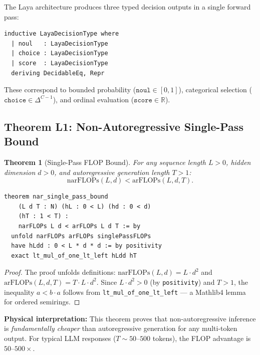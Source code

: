 \documentclass[10pt,journal,compsoc]{IEEEtran}
\newtheorem{theorem}{Theorem}
\theoremstyle{remark}
\begin{document}
The Laya architecture produces three typed decision outputs in a single forward pass:

\begin{lstlisting}[caption={Laya Decision Types in Lean 4}]
inductive LayaDecisionType where
  | noul   : LayaDecisionType
  | choice : LayaDecisionType
  | score  : LayaDecisionType
  deriving DecidableEq, Repr
\end{lstlisting}

These correspond to bounded probability ($\texttt{noul} \in [0,1]$), categorical selection ($\texttt{choice} \in \Delta^{C-1}$), and ordinal evaluation ($\texttt{score} \in \mathbb{R}$).

\subsection{Theorem L1: Non-Autoregressive Single-Pass Bound}

\begin{theorem}[Single-Pass FLOP Bound]
For any sequence length $L > 0$, hidden dimension $d > 0$, and autoregressive generation length $T > 1$:
\begin{equation}
\text{narFLOPs}(L, d) < \text{arFLOPs}(L, d, T).
\end{equation}
\end{theorem}

\begin{lstlisting}[caption={Theorem L1 in Lean 4 --- Fully Proved}]
theorem nar_single_pass_bound
    (L d T : N) (hL : 0 < L) (hd : 0 < d)
    (hT : 1 < T) :
    narFLOPs L d < arFLOPs L d T := by
  unfold narFLOPs arFLOPs singlePassFLOPs
  have hLdd : 0 < L * d * d := by positivity
  exact lt_mul_of_one_lt_left hLdd hT
\end{lstlisting}

\begin{proof}
The proof unfolds definitions: $\text{narFLOPs}(L, d) = L \cdot d^2$ and $\text{arFLOPs}(L, d, T) = T \cdot L \cdot d^2$. Since $L \cdot d^2 > 0$ (by \texttt{positivity}) and $T > 1$, the inequality $a < b \cdot a$ follows from \texttt{lt\_mul\_of\_one\_lt\_left} --- a Mathlib4 lemma for ordered semirings.
\end{proof}

\textbf{Physical interpretation:} This theorem proves that non-autoregressive inference is \emph{fundamentally cheaper} than autoregressive generation for any multi-token output. For typical LLM responses ($T \sim 50$--$500$ tokens), the FLOP advantage is $50$--$500\times$.
\end{document}
